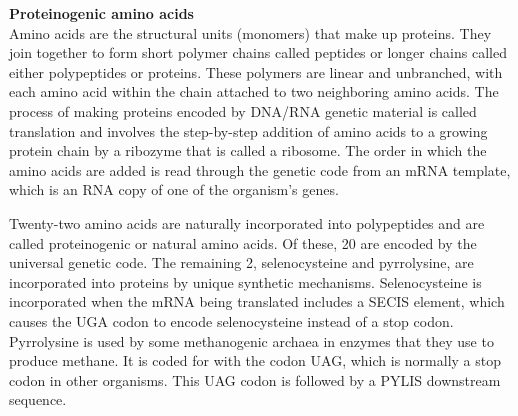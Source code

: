 \textbf{Proteinogenic amino acids}\\
Amino acids are the structural units (monomers) that make up proteins. They join together to form short polymer chains called peptides or longer chains called either polypeptides or proteins. These polymers are linear and unbranched, with each amino acid within the chain attached to two neighboring amino acids. The process of making proteins encoded by DNA/RNA genetic material is called translation and involves the step-by-step addition of amino acids to a growing protein chain by a ribozyme that is called a ribosome. The order in which the amino acids are added is read through the genetic code from an mRNA template, which is an RNA copy of one of the organism's genes. 

Twenty-two amino acids are naturally incorporated into polypeptides and are called proteinogenic or natural amino acids. Of these, 20 are encoded by the universal genetic code. The remaining 2, selenocysteine and pyrrolysine, are incorporated into proteins by unique synthetic mechanisms. Selenocysteine is incorporated when the mRNA being translated includes a SECIS element, which causes the UGA codon to encode selenocysteine instead of a stop codon. Pyrrolysine is used by some methanogenic archaea in enzymes that they use to produce methane. It is coded for with the codon UAG, which is normally a stop codon in other organisms. This UAG codon is followed by a PYLIS downstream sequence.

